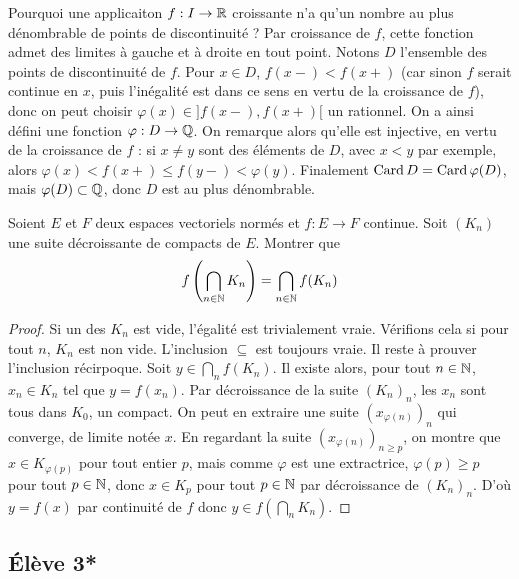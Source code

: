 \documentclass[10pt]{scrartcl}
\begin{document}
    \begin{remarks}
        Pourquoi une applicaiton $f:I\to\operatorname{\mathbb R}$ croissante n'a qu'un nombre au plus dénombrable de points de discontinuité ?
        Par croissance de $f$, cette fonction admet des limites à gauche et à droite en tout point.
        Notons $D$ l'ensemble des points de discontinuité de $f$. 
        Pour $x\in D$, $f(x-)<f(x+)$ (car sinon $f$ serait continue en $x$, puis l'inégalité est dans ce sens en vertu de la croissance de $f$), donc on peut choisir $\varphi(x)\in]f(x-),f(x+)[$ un rationnel. 
        On a ainsi défini une fonction $\varphi:D\to \operatorname{\mathbb Q}$. On remarque alors qu'elle est injective, en vertu de la croissance de $f$ : si $x\neq y$ sont des éléments de $D$, avec $x<y$ par exemple, alors $\varphi(x)<f(x+)\leq f(y-)<\varphi(y)$. 
        Finalement $\operatorname{Card} D=\operatorname{Card}\varphi(D)$, mais $\varphi(D)\subset \operatorname{\mathbb Q}$, donc $D$ est au plus dénombrable.
    \end{remarks}
    
    \begin{exo}
       Soient $E$ et $F$ deux espaces vectoriels normés et $f:E\to F$ continue. 
       Soit $(K_n)$ une suite décroissante de compacts de $E$. Montrer que 
       \[
            f\left(\bigcap_{n\in\operatorname{\mathbb N}}K_n\right)=\bigcap_{n\in\operatorname{\mathbb N}}f(K_n)
       \]
    \end{exo}

    \begin{proof}
        Si un des $K_n$ est vide, l'égalité est trivialement vraie. Vérifions cela si pour tout $n$, $K_n$ est non vide.
        L'inclusion $\subseteq$ est toujours vraie. Il reste à prouver l'inclusion récirpoque. 
        Soit $y\in\bigcap_nf(K_n)$. 
        Il existe alors, pour tout $n\in\operatorname{\mathbb N}$, $x_n\in K_n$ tel que $y=f(x_n)$. 
        Par décroissance de la suite $(K_n)_n$, les $x_n$ sont tous dans $K_0$, un compact. 
        On peut en extraire une suite $(x_{\varphi(n)})_n$ qui converge, de limite notée $x$. 
        En regardant la suite $(x_{\varphi(n)})_{n\geq p}$, on montre que $x\in K_{\varphi(p)}$ pour tout entier $p$, mais comme $\varphi$ est une extractrice, $\varphi(p)\geq p$ pour tout $p\in\operatorname{\mathbb N}$, donc $x\in K_p$ pour tout $p\in\operatorname{\mathbb N}$ par décroissance de $(K_n)_n$. 
        D'où $y=f(x)$ par continuité de $f$ donc $y\in f\left(\bigcap_nK_n\right)$.
    \end{proof}

    \subsection*{Élève 3*}
\end{document}
